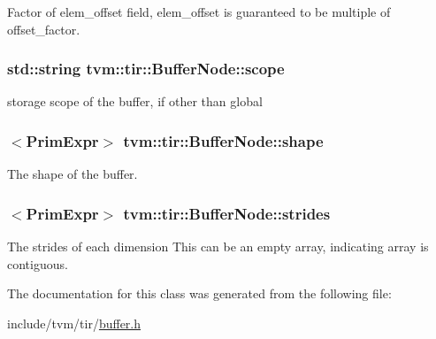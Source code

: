 Factor of elem\+\_\+offset field, elem\+\_\+offset is guaranteed to be multiple of offset\+\_\+factor. 

\subsubsection[{\texorpdfstring{scope}{scope}}]{\setlength{\rightskip}{0pt plus 5cm}std\+::string tvm\+::tir\+::\+Buffer\+Node\+::scope}\hypertarget{classtvm_1_1tir_1_1BufferNode_ab2bdf8dc7bb079c7c12a484869af7e8b}{}\label{classtvm_1_1tir_1_1BufferNode_ab2bdf8dc7bb079c7c12a484869af7e8b}


storage scope of the buffer, if other than global 

\subsubsection[{\texorpdfstring{shape}{shape}}]{$<${\bf Prim\+Expr}$>$ tvm\+::tir\+::\+Buffer\+Node\+::shape}\hypertarget{classtvm_1_1tir_1_1BufferNode_a5372baafb343f5fb263f5507b079412e}{}\label{classtvm_1_1tir_1_1BufferNode_a5372baafb343f5fb263f5507b079412e}


The shape of the buffer. 

\subsubsection[{\texorpdfstring{strides}{strides}}]{$<${\bf Prim\+Expr}$>$ tvm\+::tir\+::\+Buffer\+Node\+::strides}\hypertarget{classtvm_1_1tir_1_1BufferNode_ac18ddd10b79a30ae57d3a8283686259d}{}\label{classtvm_1_1tir_1_1BufferNode_ac18ddd10b79a30ae57d3a8283686259d}


The strides of each dimension This can be an empty array, indicating array is contiguous. 



The documentation for this class was generated from the following file\+:\begin{DoxyCompactItemize}
\item 
include/tvm/tir/\hyperlink{buffer_8h}{buffer.\+h}\end{DoxyCompactItemize}
